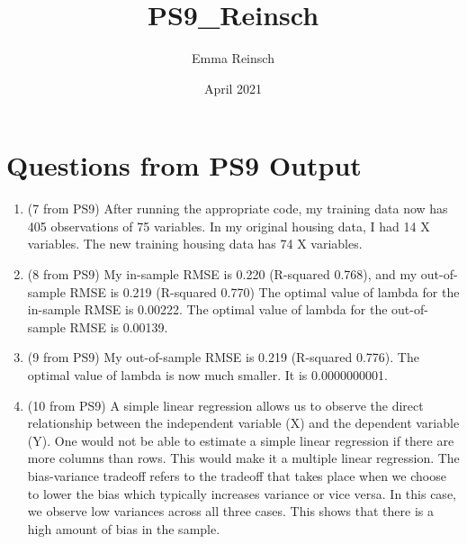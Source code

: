 \documentclass{article}
\title{PS9_Reinsch}
\author{Emma Reinsch }
\date{April 2021}
\begin{document}
\maketitle

\section{Questions from PS9 Output}
\begin{enumerate}
    \item (7 from PS9) After running the appropriate code, my training data now has 405 observations of 75 variables. In my original housing data, I had 14 X variables. The new training housing data has 74 X variables.
    \item (8 from PS9) My in-sample RMSE is 0.220 (R-squared 0.768), and my out-of-sample RMSE is 0.219 (R-squared 0.770)
    The optimal value of lambda for the in-sample RMSE is 0.00222. The optimal value of lambda for the out-of-sample RMSE is 0.00139.
    \item (9 from PS9) My out-of-sample RMSE is 0.219 (R-squared 0.776).
     The optimal value of lambda is now much smaller. It is 0.0000000001.
    \item (10 from PS9) A simple linear regression allows us to observe the direct relationship between the independent variable (X) and the dependent variable (Y). One would not be able to estimate a simple linear regression if there are more columns than rows. This would make it a multiple linear regression.
    The bias-variance tradeoff refers to the tradeoff that takes place when we choose to lower the bias which typically increases variance or vice versa. In this case, we observe low variances across all three cases. This shows that there is a high amount of bias in the sample.
\end{enumerate}
\end{document}
